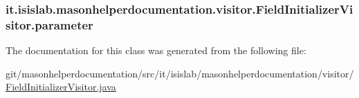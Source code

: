\hypertarget{classit_1_1isislab_1_1masonhelperdocumentation_1_1visitor_1_1_field_initializer_visitor_a8abd2a44db33a00a74453b99d98d46c2}{
\subsubsection[{parameter}]{ it.\-isislab.\-masonhelperdocumentation.\-visitor.\-Field\-Initializer\-Visitor.\-parameter\hspace{0.3cm}{\ttfamily [private]}}}\label{classit_1_1isislab_1_1masonhelperdocumentation_1_1visitor_1_1_field_initializer_visitor_a8abd2a44db33a00a74453b99d98d46c2}


The documentation for this class was generated from the following file\-:\begin{DoxyCompactItemize}
\item 
git/masonhelperdocumentation/src/it/isislab/masonhelperdocumentation/visitor/\hyperlink{_field_initializer_visitor_8java}{Field\-Initializer\-Visitor.\-java}\end{DoxyCompactItemize}
